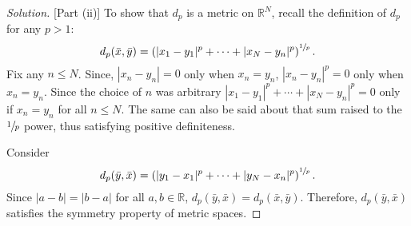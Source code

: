 \documentclass[11pt,letterpaper]{article}
\newcommand{\R}{\mathbb{R}}
\newenvironment{solution}
  {\renewcommand\qedsymbol{}\begin{proof}[Solution]}
  {\end{proof}\bigskip}
\begin{document}
\begin{solution}[Part (ii)]
	To show that $d_p$ is a metric on $\R ^N$, recall the definition of $d_p$ for any $p>1$: $$d_p(\bar x, \bar y) = \left(|x_1-y_1|^p + \cdots + |x_N-y_n|^p\right)^{\sfrac1p}.$$ Fix any $n\leq N$. Since, $|x_n-y_n| = 0$ only when $x_n = y_n$, $|x_n-y_n|^p = 0$ only when $x_n = y_n$. Since the choice of $n$ was arbitrary $|x_1-y_1|^p + \cdots + |x_N-y_n|^p = 0$ only if $x_n = y_n$ for all $n\leq N$. The same can also be said about that sum raised to the $\sfrac{1}{p}$ power, thus satisfying positive definiteness.
	
	Consider $$d_p(\bar y, \bar x) = \left(|y_1-x_1|^p + \cdots + |y_N-x_n|^p\right)^{\sfrac1p}.$$ Since $|a-b| = |b-a|$ for all $a,b \in \R$, $d_p(\bar y, \bar x) = d_p(\bar x, \bar y)$. Therefore, $d_p(\bar y, \bar x)$ satisfies the symmetry property of metric spaces.
	

\end{solution}
\end{document}
